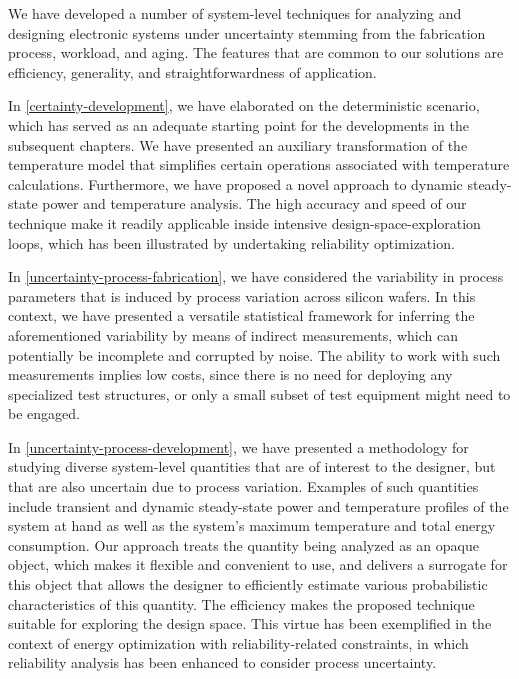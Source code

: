 We have developed a number of system-level techniques for analyzing and
designing electronic systems under uncertainty stemming from the fabrication
process, workload, and aging. The features that are common to our solutions are
efficiency, generality, and straightforwardness of application.

In \cref{certainty-development}, we have elaborated on the deterministic
scenario, which has served as an adequate starting point for the developments in
the subsequent chapters. We have presented an auxiliary transformation of the
temperature model that simplifies certain operations associated with temperature
calculations. Furthermore, we have proposed a novel approach to dynamic
steady-state power and temperature analysis. The high accuracy and speed of our
technique make it readily applicable inside intensive design-space-exploration
loops, which has been illustrated by undertaking reliability optimization.

In \cref{uncertainty-process-fabrication}, we have considered the variability in
process parameters that is induced by process variation across silicon wafers.
In this context, we have presented a versatile statistical framework for
inferring the aforementioned variability by means of indirect measurements,
which can potentially be incomplete and corrupted by noise. The ability to work
with such measurements implies low costs, since there is no need for deploying
any specialized test structures, or only a small subset of test equipment might
need to be engaged.

In \cref{uncertainty-process-development}, we have presented a methodology for
studying diverse system-level quantities that are of interest to the designer,
but that are also uncertain due to process variation. Examples of such
quantities include transient and dynamic steady-state power and temperature
profiles of the system at hand as well as the system's maximum temperature and
total energy consumption. Our approach treats the quantity being analyzed as an
opaque object, which makes it flexible and convenient to use, and delivers a
surrogate for this object that allows the designer to efficiently estimate
various probabilistic characteristics of this quantity. The efficiency makes the
proposed technique suitable for exploring the design space. This virtue has been
exemplified in the context of energy optimization with reliability-related
constraints, in which reliability analysis has been enhanced to consider process
uncertainty.

